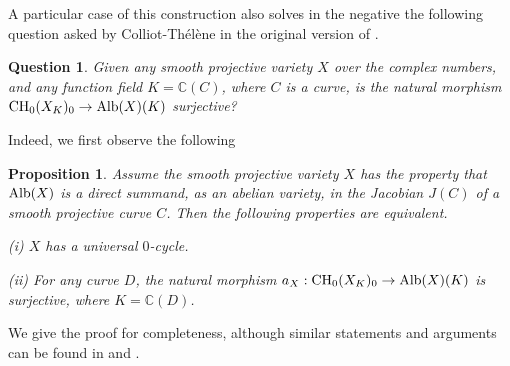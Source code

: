 \documentclass[10pt]{article}
\newtheorem{prop}[theo]{Proposition}
\newtheorem{question}[theo]{Question}
\begin{document}
  A particular case of this  construction also solves in the negative the following  question asked by Colliot-Th\'{e}l\`{e}ne in the original version of \cite{colliotTh}.
  \begin{question}\label{q2CT} Given  any  smooth projective variety $X$ over the complex numbers, and any function field $K=\mathbb{C}(C)$, where $C$ is a curve, is the natural morphism ${\rm CH}_0(X_K)_0\rightarrow {\rm Alb}(X)(K)$  surjective?
  \end{question}
  Indeed, we first observe the following
  \begin{prop} \label{propCA} Assume the smooth projective variety $X$ has the property that ${\rm Alb}(X)$ is a direct summand, as an abelian variety, in the Jacobian $J(C)$ of a smooth projective curve $C$. Then the following properties are equivalent.

  (i) $X$ has a universal $0$-cycle.

  (ii) For any curve $D$, the natural morphism $a_X: {\rm CH}_0(X_K)_0\rightarrow {\rm Alb}(X)(K)$ is surjective, where $K=\mathbb{C}(D)$.
  \end{prop}
  We give the proof for completeness, although similar statements and arguments can be found in \cite{voisinArbarello} and \cite{colliotTh}.
\end{document}

